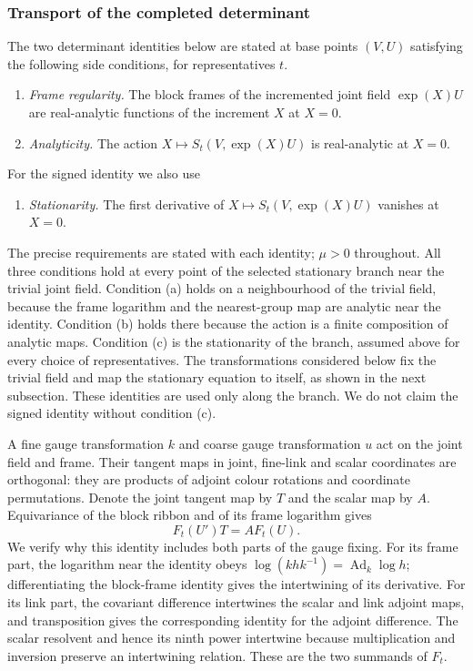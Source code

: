 \subsubsection{Transport of the completed determinant}
The two determinant identities below are stated at base points $(V,U)$
satisfying the following side conditions, for representatives $t$.
\begin{enumerate}
\item[(a)] \emph{Frame regularity.} The block frames of the
incremented joint field $\exp(X)U$ are real-analytic functions of the
increment $X$ at $X=0$.
\item[(b)] \emph{Analyticity.} The action $X\mapsto S_t(V,\exp(X)U)$ is
real-analytic at $X=0$.
\end{enumerate}
For the signed identity we also use
\begin{enumerate}
\item[(c)] \emph{Stationarity.} The first derivative of
$X\mapsto S_t(V,\exp(X)U)$ vanishes at $X=0$.
\end{enumerate}
The precise requirements are stated with each identity; $\mu>0$
throughout. All three conditions hold at every
point of the selected stationary branch near the trivial joint field.
Condition (a) holds on a neighbourhood of the trivial field, because
the frame logarithm and the nearest-group map are analytic near the
identity. Condition (b) holds there because the action is a finite
composition of analytic maps. Condition (c) is the stationarity of the
branch, assumed above for every choice of representatives. The transformations considered below
fix the trivial field and map the stationary equation to itself, as
shown in the next subsection. These identities are used only along
the branch. We do not claim the signed identity without condition (c).

A fine gauge transformation $k$ and coarse gauge transformation $u$
act on the joint field and frame. Their tangent maps in joint,
fine-link and scalar coordinates are orthogonal: they are products
of adjoint colour rotations and coordinate permutations. Denote the
joint tangent map by $T$ and the scalar map by $A$. Equivariance of
the block ribbon and of its frame logarithm gives
\[
                  F_t(U')T=AF_t(U).
\]
We verify why this identity includes both parts of the gauge fixing.
For its frame part, the logarithm near the identity obeys
$\log(khk^{-1})=\operatorname{Ad}_k\log h$; differentiating the
block-frame identity gives the intertwining of its derivative. For
its link part, the covariant difference intertwines the scalar and
link adjoint maps, and transposition gives the corresponding identity
for the adjoint difference. The scalar resolvent and hence its ninth
power intertwine because multiplication and inversion preserve an
intertwining relation. These are the two summands of $F_t$.

